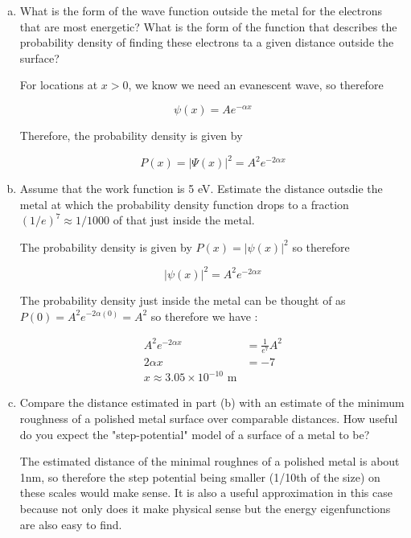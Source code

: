 \documentclass[10pt]{article}
\begin{document}
    \begin{enumerate}[(a)]
        \item What is the form of the wave function outside the metal for the electrons that are most energetic? What is the form of the function that describes the probability density of finding these electrons ta a given distance outside the surface?

        \begin{solution}
            For locations at $x > 0$, we know we need an evanescent wave, so therefore 

            \[ \psi(x) = Ae^{-\alpha x}\]

            Therefore, the probability density is given by 

            \[ P(x) = |\Psi(x)|^2 = A^2e^{-2\alpha x}\]
        \end{solution}
        \item Assume that the work function is 5 eV. Estimate the distance outsdie the metal at which the probability density function drops to a fraction $(1/e)^7 \approx 1/1000$ of that just inside the metal.
        
        \begin{solution}
            The probability density is given by $P(x) = |\psi(x)|^2$ so therefore 

            \[ |\psi(x)|^2 = A^2e^{-2\alpha x}\]

            The probability density just inside the metal can be thought of as $P(0) = A^2e^{-2\alpha(0)} = A^2$ so therefore we have :

            \begin{align*}
                A^2e^{-2\alpha x} &= \frac{1}{e^7} A^2\\
                2\alpha x &= -7 \\
                x \approx 3.05 \times 10^{-10} \text{ m}
            \end{align*}
        \end{solution}
        \item Compare the distance estimated in part (b) with an estimate of the minimum roughness of a polished metal surface over comparable distances. How useful do you expect the "step-potential" model of a surface of a metal to be?
        
        \begin{solution}
            The estimated distance of the minimal roughnes of a polished metal is about 1nm, so therefore the step potential being smaller (1/10th of the size) on these scales would make sense. It is also a useful approximation in this case because not only does it make physical sense but the energy eigenfunctions are also easy to find.       
        \end{solution} 
    \end{enumerate}
\end{document}
